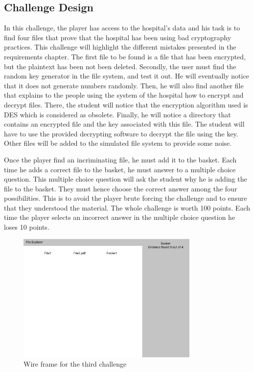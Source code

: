 \documentclass{l4proj}
\begin{document}
\subsection{Challenge Design}

In this challenge, the player has access to the hospital's data 
and his task is to find four files that prove that the hospital has been using bad cryptography practices.
This challenge will highlight the different mistakes presented in the requirements chapter.
The first file to be found is a file that has been encrypted, but the plaintext has been not been deleted.
Secondly, the user must find the random key generator in the file system, and test it out. 
He will eventually notice that it does not generate numbers randomly.
Then, he will also find another file that explains to the people using the system of the hospital
how to encrypt and decrypt files. There, the student will notice that the encryption algorithm used is 
DES which is considered as obsolete. 
Finally, he will notice a directory that contains an encrypted file and the key associated with this file.
The student will have to use the provided decrypting software to decrypt the file using the key.
Other files will be added to the simulated file system to provide some noise.

Once the player find an incriminating file, he must add it to the basket. 
Each time he adds a correct file to the basket, he must answer to a multiple choice question.
This multiple choice question will ask the student why he is adding the file to the basket.
They must hence choose the correct answer among the four possibilities. 
This is to avoid the player brute forcing the challenge and to ensure that they understood the material.
The whole challenge is worth 100 points. Each time the player selects an incorrect answer in the multiple
choice question he loses 10 points.

\begin{figure}[b]
    \centering
    \includegraphics[width=0.8\textwidth]{images/WireframeChallenge3.png}
    \caption{Wire frame for the third challenge}
    \label{fig:Challenge3}
\end{figure}
\end{document}
